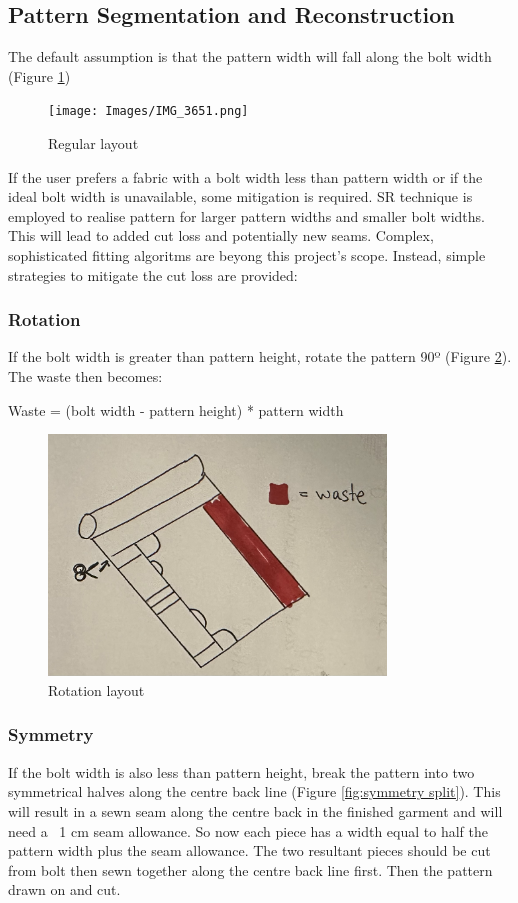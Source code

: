 \subsection{Pattern Segmentation and Reconstruction}
The default assumption is that the pattern width will fall along the bolt width (Figure \ref{fig:pw along bolt})
\begin{figure} [H]
    \centering 
    \texttt{[image: Images/IMG\_3651.png]}
    \caption{Regular layout}
    \label{fig:pw along bolt}
\end{figure}

If the user prefers a fabric with a bolt width less than pattern width or if the ideal bolt width is unavailable, some mitigation is required. SR technique is employed to realise pattern for larger pattern widths and smaller bolt widths. This will lead to added cut loss and potentially new seams. Complex, sophisticated fitting algoritms are beyong this project's scope. Instead, simple strategies to mitigate the cut loss are provided:

\subsubsection{Rotation}
If the bolt width is greater than pattern height, rotate the pattern 90º (Figure \ref{fig:ph along bolt}).
The waste then becomes:

Waste = (bolt width - pattern height) * pattern width
\begin{figure} [H]
    \centering
    \includegraphics[width = 0.8\textwidth]{Images/IMG_3652.png}
    \caption{Rotation layout}
    \label{fig:ph along bolt}
\end{figure}

\subsubsection{Symmetry}
If the bolt width is also less than pattern height, break the pattern into two symmetrical halves along the centre back line (Figure \ref{fig:symmetry split}). This will result in a sewn seam along the centre back in the finished garment and will need a ~1 cm seam allowance. So now each piece has a width equal to half the pattern width plus the seam allowance. The two resultant pieces should be cut from bolt then sewn together along the centre back line first. Then the pattern drawn on and cut.

